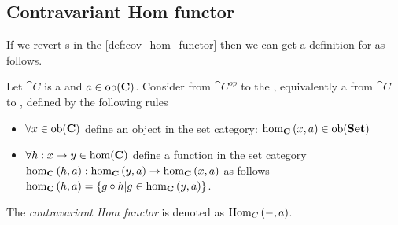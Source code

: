 \subsection{Contravariant Hom functor}
If we revert s in the \cref{def:cov_hom_functor} then we can get
a definition for  as follows.
\begin{definition}
\label{def:con_hom_functor}
Let $\cat{C}$ is a  and $a \in
\mathrm{ob}(\mathbf{C})$. Consider  from $\cat{C}^{op}$ to
the , equivalently a
 from $\cat{C}$ to
, defined by the following rules
\begin{itemize}
\item $\forall x \in \mathrm{ob}(\mathbf{C})$ define an object in the set category:
  $\catmset[C]{x}{a} \in \catob{Set}$ 
\item $\forall h: x \to y \in \mathrm{hom}(\mathbf{C})$ define a function in the set category
  $\catmset[C]{h}{a}: \catmset[C]{y}{a} \to \catmset[C]{x}{a}$ as follows
  $\catmset[C]{h}{a} = \{g \circ h | g \in \catmset[C]{y}{a}\}$.
\end{itemize}  
The \textit{contravariant Hom functor} is denoted as $\mathrm{Hom}_{C}\left(-, a\right)$.
\end{definition}

